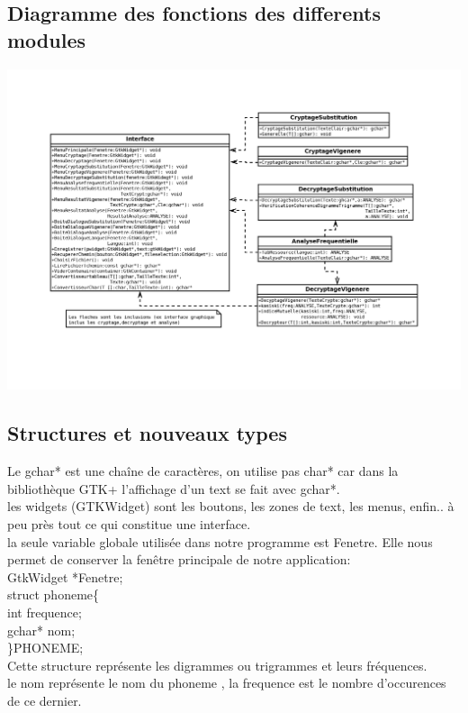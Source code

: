 \documentclass[a4]{article}
\begin{document}
		\subsection{Diagramme des fonctions des differents modules}
		\includegraphics[scale=0.8]{diaa.jpg}
		\subsection{Structures et nouveaux types}
		Le gchar* est une chaîne de caractères, on utilise pas char* car dans la bibliothèque
		GTK+ l'affichage d'un text se fait avec gchar*.\\
		
		les widgets (GTKWidget) sont les boutons, les zones de text, les menus, enfin.. à peu 
		près tout ce qui constitue une interface.\\
		
		la seule  variable globale utilisée dans notre programme est Fenetre. Elle nous permet de
		conserver la fenêtre principale de notre application:\\
		GtkWidget *Fenetre; \\
		
	struct phoneme\{\\
		int frequence;\\
		gchar* nom;\\
	\}PHONEME;\\
	Cette structure représente les digrammes ou trigrammes et leurs fréquences.\\
	le nom représente le nom du phoneme , la frequence est le nombre d'occurences\\
	de ce dernier.\\
	
\end{document}
